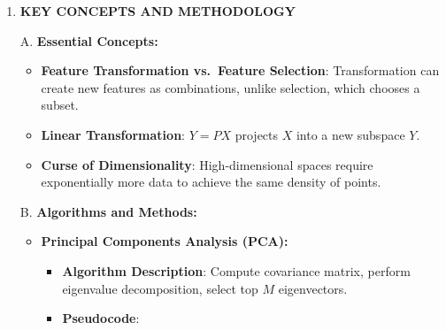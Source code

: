 \documentclass[
  12pt,
]{report}
\providecommand{\tightlist}{%
  \setlength{\itemsep}{0pt}\setlength{\parskip}{0pt}}
\begin{document}
\begin{enumerate}
\begin{itemize}
    \begin{itemize}
    \tightlist
    \item
      \textbf{Principal Components Analysis (PCA)}: Utilizes eigenvalue decomposition of the covariance matrix of \(X\) to find principal components. The first principal component maximizes variance.
    \end{itemize}
  \item
    \textbf{Theoretical Constraints and Assumptions:}

    \begin{itemize}
    \tightlist
    \item
      Assumes linearity in transformations.
    \item
      PCA assumes data is centered around the origin (often achieved by subtracting the mean).
    \end{itemize}
  \end{itemize}
\item
  \textbf{KEY CONCEPTS AND METHODOLOGY}

  A. \textbf{Essential Concepts:}

  \begin{itemize}
  \tightlist
  \item
    \textbf{Feature Transformation vs.~Feature Selection}: Transformation can create new features as combinations, unlike selection, which chooses a subset.
  \item
    \textbf{Linear Transformation}: \(Y = PX\) projects \(X\) into a new subspace \(Y\).
  \item
    \textbf{Curse of Dimensionality}: High-dimensional spaces require exponentially more data to achieve the same density of points.
  \end{itemize}

  B. \textbf{Algorithms and Methods:}

  \begin{itemize}
  \tightlist
  \item
    \textbf{Principal Components Analysis (PCA):}

    \begin{itemize}
    \tightlist
    \item
      \textbf{Algorithm Description}: Compute covariance matrix, perform eigenvalue decomposition, select top \(M\) eigenvectors.
    \item
      \textbf{Pseudocode}:
    \end{itemize}

\begin{verbatim}
\end{verbatim}


\end{itemize}
\end{enumerate}
\end{document}
